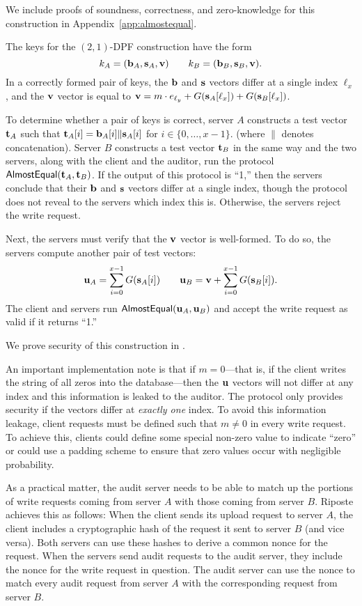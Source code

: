 \documentclass[10pt,twocolumn]{article}
\newcommand{\Name}{Riposte\xspace}
\begin{document}
We include proofs of soundness, correctness, and zero-knowledge
for this construction in Appendix~\ref{app:almostequal}.

\medskip

The keys for the $(2,1)$-DPF construction 
have the form 
\[ k_A = ({\bf b}_A, {\bf s}_A, {\bf v}) \qquad
  k_B = ({\bf b}_B, {\bf s}_B, {\bf v}).\]
In a correctly formed pair of keys, the ${\bf b}$
and ${\bf s}$ vectors differ at a single index $\ell_x$,
and the ${\bf v}$ vector is equal to 
${\bf v} = m \cdot e_{\ell_y} + G({\bf s}_A[\ell_x]) + G({\bf s}_B[\ell_x])$.

To determine whether a pair of keys is correct,
server $A$ constructs a test vector ${\bf t}_A$
such that ${\bf t}_A[i] = {\bf b}_A[i] \| {\bf s}_A[i]$
for $i \in \{0, \dots, x-1\}$.
(where $\|$ denotes concatenation).
Server $B$ constructs a test vector ${\bf t}_B$
in the same way and the two servers, along with
the client and 
the auditor, run the protocol ${\sf AlmostEqual}({\bf t}_A, {\bf t}_B)$.
If the output of this protocol is ``1,'' then the servers
conclude that their ${\bf b}$ and ${\bf s}$ vectors
differ at a single index, though the protocol
does not reveal to the servers which index this is.
Otherwise, the servers reject the write request.

Next, the servers must verify that the ${\bf v}$ vector
is well-formed.
To do so, the servers compute another pair of test vectors:
\[ {\bf u}_A = \sum_{i=0}^{x-1} G({\bf s}_A[i]) \qquad
{\bf u}_B = {\bf v} + \sum_{i=0}^{x-1} G({\bf s}_B[i]). \]
The client and servers run ${\sf AlmostEqual}({\bf u}_A, {\bf u}_B)$
and accept the write request as valid if it returns ``1.''

We prove security of this construction in 
.

An important implementation note is that if $m = 0$---that is, if the
client writes the string of all zeros into the database---then 
the ${\bf u}$ vectors will not differ at any index and this information
is leaked to the auditor.
The protocol only provides security if the vectors differ at {\em exactly one}
index.
To avoid this information leakage, client requests 
must be defined such that $m \neq 0$ in every write request.
To achieve this, clients could define some special non-zero value
to indicate ``zero'' or could use a padding scheme to ensure
that zero values occur with negligible probability.

As a practical matter, the audit server needs to be able to match up the
portions of write requests coming from server $A$ with those coming from server
$B$. \Name achieves this as follows: 
When the client sends its upload request to server $A$, the client includes a
cryptographic hash of the request it sent to server $B$ (and vice versa). 
Both servers can use these hashes to derive a common nonce for the request. 
When the servers send audit requests to the audit server, they include the nonce
for the write request in question. 
The audit server can use the 
nonce to match every audit request from server $A$ with the corresponding request
from server $B$. 
\end{document}

